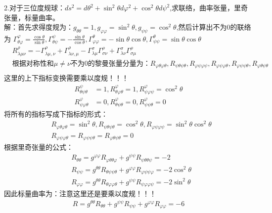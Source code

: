 \documentclass[UTF8]{ctexart}
\begin{document}
2.对于三位度规球：$ds^2=d\theta^2+\sin^2\theta d\varphi^2+\cos^2 \theta d\psi^2$,求联络，曲率张量，里奇张量，标量曲率。\\
解：首先求得度规为：$g_{\theta\theta}=1,g_{\varphi\varphi}=\sin^2\theta,g_{\psi\psi}=\cos^2\theta$,然后计算出不为0的联络为
$\Gamma_{\theta \varphi}^{\varphi}=\frac{\cos \theta}{\sin \theta},
     \Gamma_{\theta \psi}^{\psi}=-\frac{\sin \theta}{\cos \theta},\Gamma_{\varphi \varphi}^{\theta}=-\sin \theta\cos \theta,
     \Gamma_{\psi \psi}^{\theta}=\sin \theta\cos \theta$
\begin{align*}
      & R_{\lambda \mu \nu}^{\rho}=-\Gamma _{ \lambda\mu ,\nu}^{\rho}+\Gamma_{\lambda \nu ,\mu}^{\rho}-\Gamma_{\lambda \mu}^{\sigma}
     \Gamma_{\sigma \nu }^{\rho}+\Gamma_{\lambda \nu}^{\sigma}\Gamma_{\sigma \mu}^{\rho}                                                               \\
      & \text{根据对称性和}\mu\neq\nu\text{不为0的黎曼张量分量为：}R_{\varphi\theta\varphi\theta},R_{\psi\theta\psi\theta},R_{\varphi\psi\varphi\psi},
     R_{\varphi\psi\varphi\theta},R_{\varphi\psi\psi\theta},R_{\varphi\theta\psi\theta}                                                                \\
\end{align*}
这里的上下指标变换需要乘以度规！！！
\begin{align*}
     R_{\theta\psi\theta}^{\psi}     & =1,R_{\theta\varphi\theta}^{\varphi}=1,R_{\psi\varphi\psi}^{\varphi}=\cos^2 \theta \\
     R_{\psi\varphi\theta}^{\varphi} & =0,R_{\theta\psi\theta}^{\varphi}=0,R_{\psi\psi\theta}^{\varphi}=0
\end{align*}
将所有的指标写成下指标的形式：
\begin{align*}
      & R_{\varphi\theta\varphi\theta}=\sin^2\theta,R_{\psi\theta\psi\theta}=\cos^2\theta,R_{\varphi\psi\varphi\psi}=\sin^2\theta\cos ^2\theta \\
      & R_{\varphi\psi\varphi\theta}=R_{\varphi\psi\psi\theta}=R_{\varphi\theta\psi\theta}=0
\end{align*}
根据里奇张量的公式：
\begin{align*}
      & R_{\theta\theta}=g^{\varphi\varphi}R_{\varphi\theta\theta\varphi}+g^{\psi\psi}R_{\psi\theta\theta\psi}=-2               \\
      & R_{\psi\psi}=g^{\theta\theta}R_{\theta\psi\psi\theta}+g^{\varphi\varphi}R_{\varphi\psi\psi\varphi}=-2\cos^2\theta       \\
      & R_{\varphi\varphi}=g^{\theta\theta}R_{\theta\varphi\varphi\theta}+g^{\psi\psi}R_{\psi\varphi\varphi\psi}=-2\sin^2\theta
\end{align*}
因此标量曲率为：注意这里还是要乘以度规！！！
\begin{align*}
     R=g^{\theta\theta}R_{\theta\theta}+g^{\psi\psi}R_{\psi\psi}+g^{\varphi\varphi}R_{\varphi\varphi}=-6
\end{align*}
\end{document}
